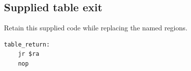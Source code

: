 \subsection*{Supplied table exit}
Retain this supplied code while replacing the named regions.

\begin{verbatim}
table_return:
    jr $ra
    nop
\end{verbatim}
